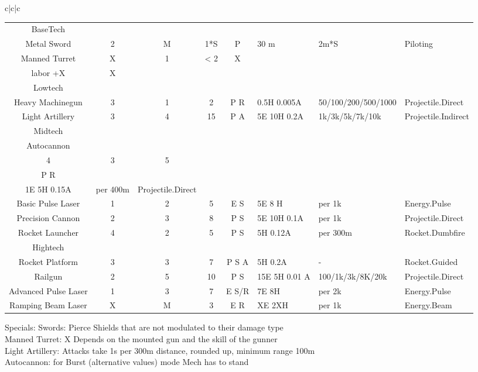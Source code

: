 \documentclass{article}
\begin{document}
\begin{tabular}{c|c|c}
\begin{tabular}{c|cccclll}
        \hline BaseTech&&&&&\\
        Metal Sword & 2 & M & 1*S & P&  30 m & 2m*S & Piloting \\
        Manned Turret & X & 1 & < 2 & X & \makecell[l]{manual \\labor +X} &  X & \makecell[{c}{p{3cm}}]{X}\\
        \hline Lowtech &&&&&\\
        Heavy Machinegun & 3 & 1 & 2 & P R& 0.5H 0.005A & 50/100/200/500/1000 & Projectile.Direct\\
        Light Artillery & 3 & 4 & 15 & P A & 5E 10H 0.2A & 1k/3k/5k/7k/10k & Projectile.Indirect \\
        \hline Midtech &&&&&\\
        Autocannon & \makecell[c]{~2/\\4} & 3 & 5 & \makecell[c]{P/\\P R} &\makecell[l]{0E 2H 0.01A /\\1E 5H 0.15A }& per 400m & Projectile.Direct\\
        Basic Pulse Laser & 1 & 2 & 5 & E S & 5E 8 H & per 1k & Energy.Pulse\\
        Precision Cannon & 2 &3& 8 & P S & 5E 10H 0.1A & per 1k & Projectile.Direct\\
        Rocket Launcher & 4 & 2 & 5 & P S & 5H 0.12A &per 300m & Rocket.Dumbfire\\
        \hline Hightech &&&&&\\
        Rocket Platform & 3 & 3 & 7 & P S A & 5H 0.2A & - & Rocket.Guided \\
        Railgun & 2 &5& 10 & P S & 15E 5H 0.01 A& 100/1k/3k/8K/20k & Projectile.Direct\\
        Advanced Pulse Laser    & 1 & 3 & 7 & E S/R & 7E 8H  &per  2k & Energy.Pulse \\
        Ramping Beam Laser              & X & M & 3 & E R        & XE 2XH & per 1k & Energy.Beam \\
    \end{tabular}\newline
    Specials:
    Swords: Pierce Shields that are not modulated to their damage type\\
    Manned Turret: X Depends on the mounted gun and the skill of the gunner\\
    Light Artillery: Attacks take 1s per 300m distance, rounded up, minimum range 100m\\
    Autocannon: for Burst (alternative values) mode Mech has to stand\\

\end{tabular}
\end{document}
